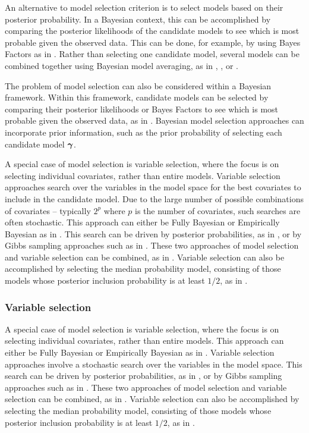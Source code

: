 An alternative to model selection criterion is to select models based on their posterior probability. In a
Bayesian context, this can be accomplished by comparing the posterior likelihoods of the candidate models to
see which is most probable given the observed data. This can be done, for example, by using Bayes Factors as
in \cite{Kass1993}. Rather than selecting one candidate model, several models can be combined together using
Bayesian model averaging, as in \cite{Hoeting1999}, \cite{Raftery1997}, \cite{Fernandez2001} or
\cite{Papaspiliopoulos2016}.

The problem of model selection can also be considered within a Bayesian framework. Within this framework,
candidate models can be selected by comparing their posterior likelihoods or Bayes Factors to see which is
most probable given the observed data, as in \cite{Kass1993}. Bayesian model selection approaches can
incorporate prior information, such as the prior probability of selecting each candidate model ${\boldsymbol \gamma}$.

A special case of model selection is variable selection, where the focus is on selecting individual
covariates, rather than entire models. Variable selection approaches search over the
variables in the model space for the best covariates to include in the candidate model. Due to the large
number of possible combinations of covariates -- typically $2^p$ where $p$ is the number of covariates, such
searches are often stochastic. This approach can either be Fully Bayesian or Empirically Bayesian as in
\cite{Cui2008}.  This search can be driven by posterior probabilities, as in \cite{Casella2006}, or by Gibbs
sampling approaches such as in \cite{George1993}. These two approaches of model selection and variable
selection can be combined, as in \cite{Geweke1996}. Variable selection can also be accomplished by selecting
the median probability model, consisting of those models whose posterior inclusion probability is at least
$1/2$, as in \cite{Barbieri2004}.

\subsubsection{Variable selection}
A special case of model selection is variable selection, where the focus is on selecting individual
covariates, rather than entire models. This approach can either be Fully Bayesian or Empirically Bayesian as
in \citep{Cui2008}. Variable selection approaches involve a stochastic search over the variables in the model
space. This search can be driven by posterior probabilities, as in \citep{Casella2006}, or by Gibbs sampling
approaches such as in \citep{George1993}. These two approaches of model selection and variable selection can
be combined, as in \citep{Geweke1996}. Variable selection can also be accomplished by selecting the median
probability model, consisting of those models whose posterior inclusion probability is at least $1/2$, as in
\citep{Barbieri2004}.

